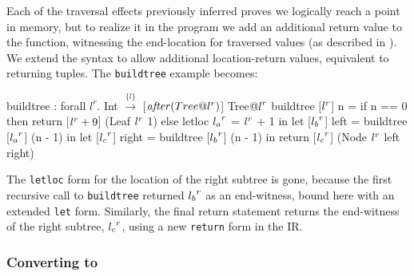 \documentclass[showabstract,showacknowledgments,showpreface,showdedication]{iuphd}
\theoremstyle{nonumberplain}
\newcommand{\il}[1]{\lstinline[style=inline,mathescape=true];#1;}
\begin{document}
Each of the traversal effects previously inferred proves we logically reach a
point in memory, but to realize it in the program we add an
additional return value to the function, witnessing the end-location for
traversed values (as described in \cite{ecoop17-gibbon}).
%
We extend the syntax to allow additional location-return values,
equivalent to returning tuples.  The \il{buildtree} example becomes:
%

\begin{code}
buildtree : forall $l^r$. Int $\xrightarrow{\{l\}}$ [$\mathit{after}(Tree @ {l}^{r})$] Tree${@l}^{r}$
buildtree [${l}^{r}$]  n =
  if n == 0 then return [${l}^{r}+9$] (Leaf ${l}^{r}$ 1)
  else letloc ${l_a}^{r}$ = ${l}^{r}$ + 1 in
       let [${l_b}^{r}$] left = buildtree [${l_a}^{r}$] (n - 1) in
       let [${l_c}^{r}$] right = buildtree [${l_b}^{r}$] (n - 1) in
       return [${l_c}^{r}$] (Node ${l}^{r}$ left right)
\end{code}%


The \il{letloc} form for the location of the right subtree is gone, because
the first recursive call to \il{buildtree} returned ${l_b}^{r}$ as an end-witness,
bound here with an extended \il{let} form.
Similarly, the final return statement returns the end-witness of the right subtree,
${l_c}^{r}$, using a new \il{return} form in the IR.

\subsubsection{Converting to \lamcur}
\label{sec:cursorize}
\end{document}

